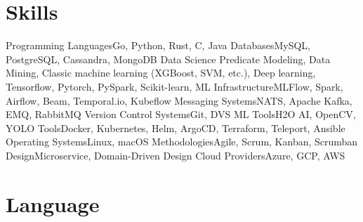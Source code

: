 \section{Skills}

\cvline%
{Programming Languages}{Go, Python, Rust, C, Java}
\cvline%
{Databases}{MySQL, PostgreSQL, Cassandra, MongoDB}
\cvline%
{Data Science}{
  Predicate Modeling, Data Mining,
  Classic machine learning (XGBoost, SVM, etc.),
  Deep learning, Tensorflow, Pytorch, PySpark, Scikit-learn,
}
\cvline%
{ML Infrastructure}{MLFlow, Spark, Airflow, Beam, Temporal.io, Kubeflow}
\cvline%
{Messaging Systems}{NATS, Apache Kafka, EMQ, RabbitMQ}
\cvline%
{Version Control Systems}{Git, DVS}
\cvline%
{ML Tools}{H2O AI, OpenCV, YOLO}
\cvline%
{Tools}{Docker, Kubernetes, Helm, ArgoCD, Terraform, Teleport, Ansible}
\cvline%
{Operating Systems}{Linux, macOS}
\cvline%
{Methodologies}{Agile, Scrum, Kanban, Scrumban}
\cvline%
{Design}{Microservice, Domain-Driven Design}
\cvline%
{Cloud Providers}{Azure, GCP, AWS}

\section{Language}


\emptysection{}\closesection{}
